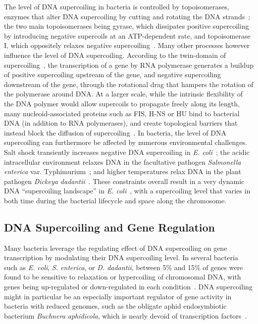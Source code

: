 The level of DNA supercoiling in bacteria is controlled by topoisomerases, enzymes that alter DNA supercoiling by cutting and rotating the DNA strands~\citep{duprey2021}; the two main topoisomerases being gyrase, which dissipates positive supercoiling by introducing negative supercoils at an ATP-dependent rate, and topoisomerase I, which oppositely relaxes negative supercoiling~\citep{martisb.2019}.
Many other processes however influence the level of DNA supercoiling.
According to the twin-domain of supercoiling~\citep{liu1987}, the transcription of a gene by RNA polymerase generates a buildup of positive supercoiling upstream of the gene, and negative supercoiling downstream of the gene, through the rotational drag that hampers the rotation of the polymerase around DNA.
At a larger scale, while the intrinsic flexibility of the DNA polymer would allow supercoils to propagate freely along its length, many nucleoid-associated proteins such as FIS, H-NS or HU bind to bacterial DNA (in addition to RNA polymerases), and create topological barriers that instead block the diffusion of supercoiling~\citep{travers2005}.
In bacteria, the level of DNA supercoiling can furthermore be affected by numerous environmental challenges.
Salt shock transiently increases negative DNA supercoiling in \emph{E. coli}~\citep{hsieh1991}; the acidic intracellular environment relaxes DNA in the facultative pathogen \emph{Salmonella enterica} var. Typhimurium~\citep{marshall2000}; and higher temperatures relax DNA in the plant pathogen \emph{Dickeya dadantii}~\citep{herault2014}.
These constraints overall result in a very dynamic DNA ``supercoiling landscape'' in \emph{E. coli}~\citep{visser2022}, with a supercoiling level that varies in both time during the bacterial lifecycle and space along the chromosome.

\subsection{DNA Supercoiling and Gene Regulation}

Many bacteria leverage the regulating effect of DNA supercoiling on gene transcription by modulating their DNA supercoiling level.
In several bacteria such as \emph{E. coli}, \emph{S. enterica}, or \emph{D. dadantii}, between 5\% and 15\% of genes were found to be sensitive to relaxation or hypercoiling of chromosomal DNA, with genes being up-regulated or down-regulated in each condition~\citep{peter2004, ferrandiz2010, webber2013, pineau2022a}.
DNA supercoiling might in particular be an especially important regulator of gene activity in bacteria with reduced genomes, such as the obligate aphid endosymbiotic bacterium \emph{Buchnera aphidicola}, which is nearly devoid of transcription factors~\citep{brinza2013}.

